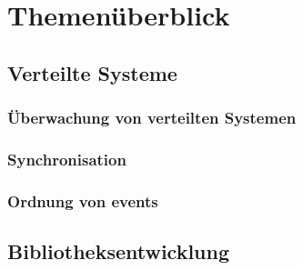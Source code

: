 %

\chapter{Themenüberblick}

\section{Verteilte Systeme}
\subsection{Überwachung von verteilten Systemen}
\subsection{Synchronisation}
\subsection{Ordnung von events}
\section{Bibliotheksentwicklung}
